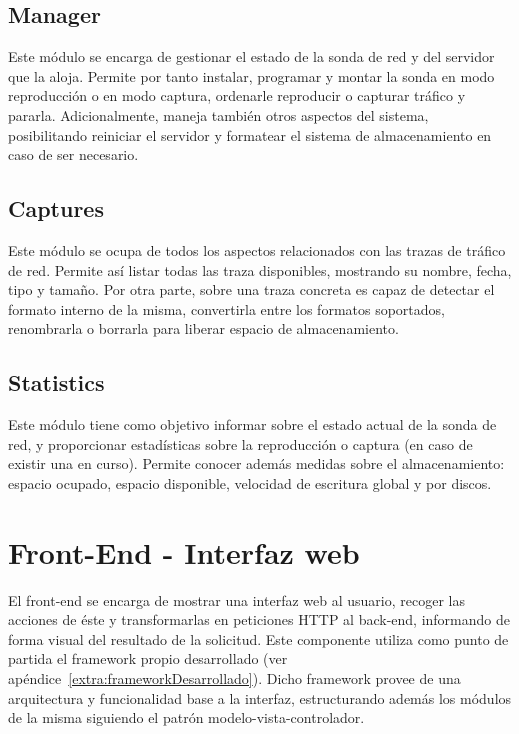 \subsection{Manager\label{ssec:dis:manager}}

Este módulo se encarga de gestionar el estado de la sonda de red y del servidor que la aloja.
Permite por tanto instalar, programar y montar la sonda en modo reproducción o en modo captura, ordenarle reproducir o capturar tráfico y pararla.
Adicionalmente, maneja también otros aspectos del sistema, posibilitando reiniciar el servidor y formatear el sistema de almacenamiento en caso de ser necesario.


\subsection{Captures\label{ssec:dis:captures}}

Este módulo se ocupa de todos los aspectos relacionados con las \glspl{traza} de tráfico de red.
Permite así listar todas las \gls{traza} disponibles, mostrando su nombre, fecha, tipo y tamaño.
Por otra parte, sobre una \gls{traza} concreta es capaz de detectar el formato interno de la misma, convertirla entre los formatos soportados, renombrarla o borrarla para liberar espacio de almacenamiento.


\subsection{Statistics\label{ssec:dis:statistics}}

Este módulo tiene como objetivo informar sobre el estado actual de la sonda de red, y proporcionar estadísticas sobre la reproducción o captura (en caso de existir una en curso).
Permite conocer además medidas sobre el almacenamiento: espacio ocupado, espacio disponible, velocidad de escritura global y por discos.


\section{Front-End - Interfaz web\label{sec:dis:interfaz_web}}

El \gls{front-end} se encarga de mostrar una interfaz web al usuario, recoger las acciones de éste y transformarlas en peticiones \gls{HTTP} al \gls{back-end}, informando de forma visual del resultado de la solicitud.
Este componente utiliza como punto de partida el \gls{framework} propio desarrollado (ver apéndice~\ref{extra:frameworkDesarrollado}).
Dicho \gls{framework} provee de una arquitectura y funcionalidad base a la interfaz, estructurando además los módulos de la misma siguiendo el patrón modelo-vista-controlador.

